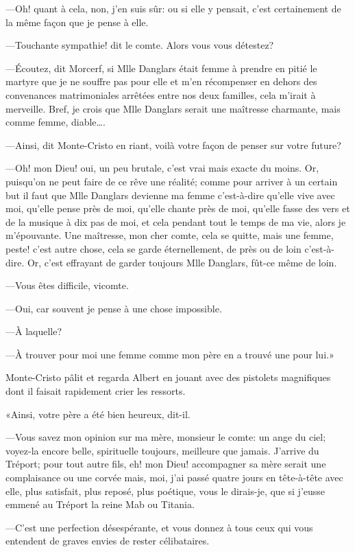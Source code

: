 —Oh! quant à cela, non, j'en suis sûr: ou si elle y pensait, c'est certainement de la même façon que je pense à elle.  

—Touchante sympathie! dit le comte. Alors vous vous détestez? 

—Écoutez, dit Morcerf, si Mlle Danglars était femme à prendre en pitié le martyre que je ne souffre pas pour elle et m'en récompenser en dehors des convenances matrimoniales arrêtées entre nos deux familles, cela m'irait à merveille. Bref, je crois que Mlle Danglars serait une maîtresse charmante, mais comme femme, diable\dots. 

—Ainsi, dit Monte-Cristo en riant, voilà votre façon de penser sur votre future? 

—Oh! mon Dieu! oui, un peu brutale, c'est vrai mais exacte du moins. Or, puisqu'on ne peut faire de ce rêve une réalité; comme pour arriver à un certain but il faut que Mlle Danglars devienne ma femme c'est-à-dire qu'elle vive avec moi, qu'elle pense près de moi, qu'elle chante près de moi, qu'elle fasse des vers et de la musique à dix pas de moi, et cela pendant tout le temps de ma vie, alors je m'épouvante. Une maîtresse, mon cher comte, cela se quitte, mais une femme, peste! c'est autre chose, cela se garde éternellement, de près ou de loin c'est-à-dire. Or, c'est effrayant de garder toujours Mlle Danglars, fût-ce même de loin. 

—Vous êtes difficile, vicomte. 

—Oui, car souvent je pense à une chose impossible. 

—À laquelle? 

—À trouver pour moi une femme comme mon père en a trouvé une pour lui.» 

Monte-Cristo pâlit et regarda Albert en jouant avec des pistolets magnifiques dont il faisait rapidement crier les ressorts. 

«Ainsi, votre père a été bien heureux, dit-il. 

—Vous savez mon opinion sur ma mère, monsieur le comte: un ange du ciel; voyez-la encore belle, spirituelle toujours, meilleure que jamais. J'arrive du Tréport; pour tout autre fils, eh! mon Dieu! accompagner sa mère serait une complaisance ou une corvée mais, moi, j'ai passé quatre jours en tête-à-tête avec elle, plus satisfait, plus reposé, plus poétique, vous le dirais-je, que si j'eusse emmené au Tréport la reine Mab ou Titania. 

—C'est une perfection désespérante, et vous donnez à tous ceux qui vous entendent de graves envies de rester célibataires. 

